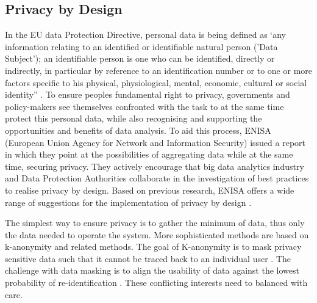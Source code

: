 \subsection{Privacy by Design}
\label{sec:pbd}
In the EU data Protection Directive, personal data is being defined as ‘any information relating to an identified or identifiable natural person ('Data Subject'); an identifiable person is one who can be identified, directly or indirectly, in particular by reference to an identification number or to one or more factors specific to his physical, physiological, mental, economic, cultural or social identity” \cite{european_data_protection}. 
To ensure peoples fundamental right to privacy, governments and policy-makers see themselves confronted with the task to at the same time protect this personal data, while also recognising and supporting the opportunities and benefits of data analysis.
To aid this process, ENISA (European Union Agency for Network and Information Security) issued a report in which they point at the possibilities of aggregating data while at the same time, securing privacy. 
They actively encourage that big data analytics industry and Data Protection Authorities collaborate in the investigation of best practices to realise privacy by design. 
Based on previous research, ENISA offers a wide range of suggestions for the implementation of privacy by design \cite{d2015privacy}.

The simplest way to ensure privacy is to gather the minimum of data, thus only the data needed to operate the system. 
More sophisticated methods are based on k-anonymity and related methods. The goal of K-anonymity is to mask privacy sensitive data such that it cannot be traced back to an individual user \cite{sweeney2002k}. 
The challenge with data masking is to align the usability of data against the lowest probability of re-identification \cite{d2015privacy}. 
These conflicting interests need to balanced with care.






